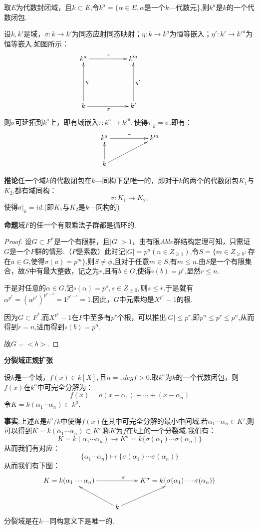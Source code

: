 \documentclass[UTF8]{article}
\begin{document}
取$E$为代数封闭域，且$k\subset E$,令$k^a=\{\alpha \in E,\alpha$是一个$k$—代数元\},则$k^a$是$k$的一个代数闭包.

设$k,k'$是域，$\sigma :k\rightarrow k'$为同态应射同态映射；$\eta :k\rightarrow k^a$为恒等嵌入；$\eta' :k'\rightarrow k'^a$为恒等嵌入.如图所示：
$$\xymatrix{k^a\ar[rr]^{\tau}&&{k'^a}\\ \\ k\ar[uu]_{\eta}\ar[rr]_{\sigma}&&{k'}\ar[uu]_{\eta'}&&}$$
则$\sigma$可延拓到$ k^a$上，即有域嵌入$\tau :k^a\rightarrow k'^a,$使得$\tau |_k=\sigma.$即有：
$$\xymatrix{k^a\ar[rr]^{\tau}&&{k'^a}\\ k\ar[u] \ar[rru] && }$$

\textbf{推论}\quad 任一个域$k$的代数闭包在$k$—同构下是唯一的，即对于$k$的两个的代数闭包$K_1$与$K_2$,都有域同构：$$\sigma :K_1\rightarrow K_2,$$使得$\sigma |_k=id$.(即$K_1$与$K_2$是$k$—同构的)

\textbf{命题}\quad 域$F$的任一个有限乘法子群都是循环的.
\begin{proof}
设$G\subset F^*$是一个有限群，且$|G|>1$，由有限$Able$群结构定理可知，只需证$G$是一个$P$群的情形.（$P$是素数）此时记$ |G|=p^n(n\in Z_{\ge 1})$,令$S=\{m\in Z_{\ge 0}:$存在$a\in G$,使得$\sigma(a)=p^m\}$,则$S\ne \phi $,且对于任意$m\in S$,有$m\le n$.由$S$是一个有限集合，故$S$中有最大整数，记之为$r$,且有$b\in G$,使得$\circ(b)=p^r$,显然$r\le n.$

于是对任意的$\alpha \in G$,记$\circ(\alpha)=p^s,s\in Z_{\ge0},$则$s\le r$.于是就有$\alpha^{p^r}=(\alpha^{p^s})^{p^{r-s}}=1^{p^{r-s}}=1.$因此，$G$中元素均是$X^{p^r}-1$的根.

因为$G\subset F^*$,而$X^{p^r}-1$在$F$中至多有$ p^r $个根，可以推出$|G|\le {p^r}$,即${p^n}\le {p^r}\le {p^n}$,从而得到$r=n$,进而得到$\circ(b)=p^n$.

故$G=<b>$.
\end{proof}

\textbf{分裂域\quad 正规扩张}

设$k$是一个域，$f(x)\in k[X],$且$n=,degf>0$,取$k^a$为$k$的一个代数闭包，则$f(x)$在$k^a$中可完全分解为：$$f(x)=a(x-\alpha_1)+\cdots+(x-\alpha_n)$$令$K=k(\alpha_1 \cdots \alpha_n)\subset k^a.$

\textbf{事实}:上述$K$是$k^a/k$中使得$f(x)$在其中可完全分解的最小中间域.若$\alpha_1 \cdots \alpha_n\in K'$,则可以得到$K=k(\alpha_1 \cdots \alpha_n)\subset K'$,称$K$为$f$在$k$上的一个分裂域.我们有：$$K=k(\alpha_1 \cdots \alpha_n)\rightarrow K^{\sigma}=k\{\sigma(\alpha_1)\cdots\sigma(\alpha_n)\}$$
从而我们有对应：$$\{\alpha_1 \cdots \alpha_n\}\longmapsto \{\sigma(\alpha_1)\cdots\sigma(\alpha_n)\}$$从而我们有下图：$$\xymatrix{K=k(\alpha_1 \cdots \alpha_n)\ar[rr]^{\sigma}&&{K^{\sigma}=k\{\sigma(\alpha_1)\cdots\sigma(\alpha_n)\}}\\& k\ar[lu] \ar[ru]& }$$分裂域是在$k$—同构意义下是唯一的.
\end{document}
